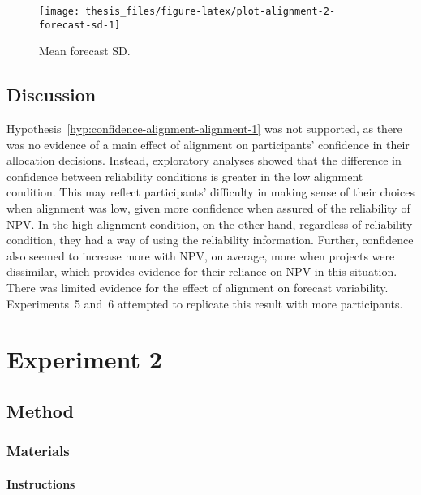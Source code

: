 \documentclass[a4paper, nobind]{templates/ociamthesis}
\theoremstyle{definition}
\theoremstyle{definition}
\theoremstyle{definition}
\theoremstyle{definition}
\theoremstyle{remark}
\begin{document}
\begin{figure}
\texttt{[image: thesis\_files/figure-latex/plot-alignment-2-forecast-sd-1]} \caption{Mean forecast SD.}\label{fig:plot-alignment-2-forecast-sd}
\end{figure}

\subsection{Discussion}

Hypothesis~\ref{hyp:confidence-alignment-alignment-1} was not supported, as
there was no evidence of a main effect of alignment on participants' confidence
in their allocation decisions. Instead, exploratory analyses showed that the
difference in confidence between reliability conditions is greater in the low
alignment condition. This may reflect participants' difficulty in making sense
of their choices when alignment was low, given more confidence when assured of
the reliability of NPV. In the high alignment condition, on the other hand,
regardless of reliability condition, they had a way of using the reliability
information. Further, confidence also seemed to increase more with NPV, on
average, more when projects were dissimilar, which provides evidence for their
reliance on NPV in this situation. There was limited evidence for the effect of
alignment on forecast variability. Experiments~5 and~6 attempted to replicate
this result with more participants.

\hypertarget{alignment-3-appendix}{%
\section{Experiment 2}\label{alignment-3-appendix}}

\subsection{Method}

\subsubsection{Materials}

\hypertarget{instructions-materials-alignment-3-appendix}{%
\paragraph{Instructions}\label{instructions-materials-alignment-3-appendix}}
\end{document}
